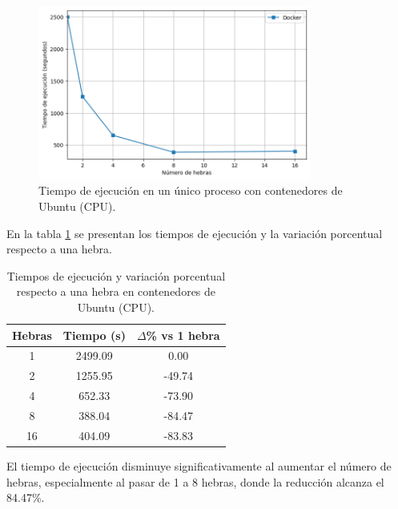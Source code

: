 \begin{figure}[ht]
    \centering
    \includegraphics[width=0.8\textwidth]{imagenes/cap5/single-node_ubuntu_docker_time.png}
    \caption{Tiempo de ejecución en un único proceso con contenedores de Ubuntu (CPU).}
    \label{fig:single-node_ubuntu_docker_time}
\end{figure}

En la tabla \ref{tab:single-node_ubuntu_docker} se presentan los tiempos de ejecución y la variación porcentual respecto a una hebra.

\begin{table}[ht]
    \centering
    \begin{tabular}{|c|c|c|}
        \hline
        \textbf{Hebras} & \textbf{Tiempo (s)} & \textbf{$\Delta$\% vs 1 hebra} \\
        \hline
        1               & 2499.09             & 0.00                           \\
        2               & 1255.95             & -49.74                         \\
        4               & 652.33              & -73.90                         \\
        8               & 388.04              & -84.47                         \\
        16              & 404.09              & -83.83                         \\
        \hline
    \end{tabular}
    \caption{Tiempos de ejecución y variación porcentual respecto a una hebra en contenedores de Ubuntu (CPU).}
    \label{tab:single-node_ubuntu_docker}
\end{table}

El tiempo de ejecución disminuye significativamente al aumentar el número de hebras, especialmente al pasar de 1 a 8 hebras, donde la reducción alcanza el 84.47\%.

